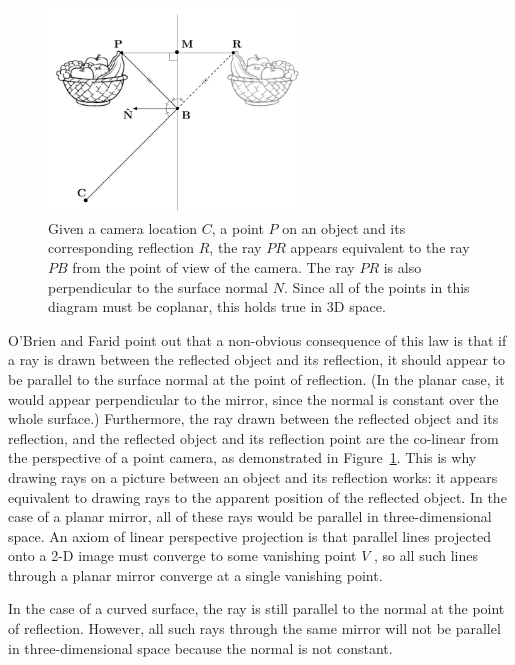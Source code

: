 \documentclass{article}
\begin{document}
\begin{figure}
	\centering
    	\includegraphics[width=0.6\textwidth]{normal-reflection}
	\caption{Given a camera location $C$, a point $P$ on an object and its corresponding reflection $R$, the ray $PR$ appears equivalent to the ray $PB$ from the point of view of the camera. The ray $PR$ is also perpendicular to the surface normal $N$. Since all of the points in this diagram must be coplanar, this holds true in 3D space. \cite[Fig.~2]{obrien12}}
	\label{normal-reflection}
\end{figure}

O'Brien and Farid point out that a non-obvious consequence of this law is that if a ray is drawn between the reflected object and its reflection, it should appear to be parallel to the surface normal at the point of reflection. (In the planar case, it would appear perpendicular to the mirror, since the normal is constant over the whole surface.) Furthermore, the ray drawn between the reflected object and its reflection, and the reflected object and its reflection point are the co-linear from the perspective of a point camera, as demonstrated in Figure~\ref{normal-reflection}. This is why drawing rays on a picture between an object and its reflection works: it appears equivalent to drawing rays to the apparent position of the reflected object. In the case of a planar mirror, all of these rays would be parallel in three-dimensional space.\nocite{obrien12} An axiom of linear perspective projection is that parallel lines projected onto a 2-D image must converge to some vanishing point $V$ \cite[p.~2]{hartley}, so all such lines through a planar mirror converge at a single vanishing point.

In the case of a curved surface, the ray is still parallel to the normal at the point of reflection. However, all such rays through the same mirror will not be parallel in three-dimensional space because the normal is not constant.
\end{document}
